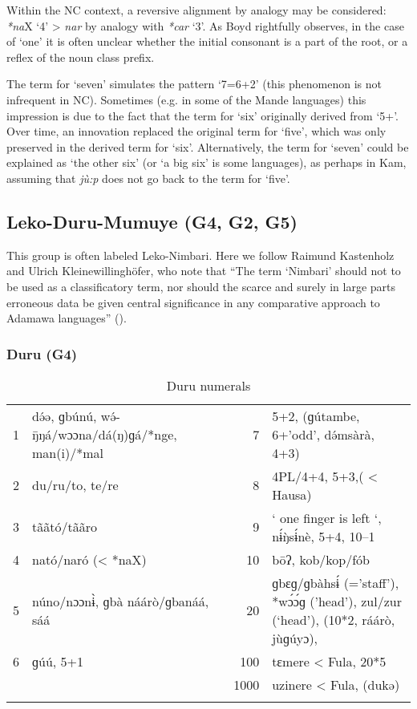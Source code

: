 Within the NC context, a reversive alignment by analogy may be considered: \textit{*na}X ‘4’ > \textit{nar} by analogy with \textit{*car} ‘3’. As Boyd rightfully observes, in the case of ‘one’ it is often unclear whether the initial consonant is a part of the root, or a reflex of the noun class prefix. 

The term for ‘seven’ simulates the pattern ‘7=6+2’ (this phenomenon is not infrequent in NC). Sometimes (e.g. in some of the Mande languages) this impression is due to the fact that the term for ‘six’ originally derived from ‘5+’. Over time, an innovation replaced the original term for ‘five’, which was only preserved in the derived term for ‘six’. Alternatively, the term for ‘seven’ could be explained as ‘the other six’ (or ‘a big six’ is some languages), as perhaps in Kam, assuming that \textit{j{\`{u}}:p} does not go back to the term for ‘five’.


\subsection{Leko-Duru-Mumuye (G4, G2, G5)} %
{ This group is often labeled Leko-Nimbari. Here we follow Raimund Kastenholz and Ulrich Kleinewillinghöfer, who note that ``The term ‘Nimbari’ should not to be used as a classificatory term, nor should the scarce and surely in large parts erroneous data be given central significance in any comparative approach to Adamawa languages'' (\citealt{KastenholzKleinewillinghöfer2012}).} 
\subsubsection{Duru (G4)}%
\begin{table}
\caption{\label{tab:3:105}Duru numerals}


\begin{tabularx}{\textwidth}{lQrQ}
\lsptoprule

1 & d{\'{ə}}ə, ɡbúnú, w{\'{ə}}-{\={ŋ}}ŋá/wɔɔna/dá(ŋ)ɡá/*nge, man(i)/*mal & 7 & 5+2, (ɡútambe, 6+'odd', d{\'{ə}}msàrà, 4+3)\\
2 & du/ru/to, te/re & 8 & 4PL/4+4, 5+3,( < Hausa)\\
3 & t{\~{a}}{\~{a}}tó/t{\~{a}}{\~{a}}ro & 9 & ` one finger is left `, n{\'{ɨ}}{\`{ŋ}}s{\'{ɨ}}nè, 5+4, 10--1\\
4 & nató/naró (< *naX) & 10 & b{\={o}}ʔ, kob/kop/fób\\
5 & núno/nɔɔn{\`{ɨ}}, ɡbà náárò/ɡbanáá, sáá & 20 & ɡbɛɡ/ɡbàhs{\'{ɨ}} (='staff'), *w{\'{ɔ}}{\'{ɔ}}ɡ ('head'), zul/zur (‘head'), (10*2, ráárò, j{\`{u}}ɡúyɔ),\\
6 & ɡúú, 5+1 & 100 & tɛmere < Fula, 20*5\\
&  & 1000 & uzinere < Fula, (dukə)\\
\lspbottomrule
\end{tabularx}
\end{table}

